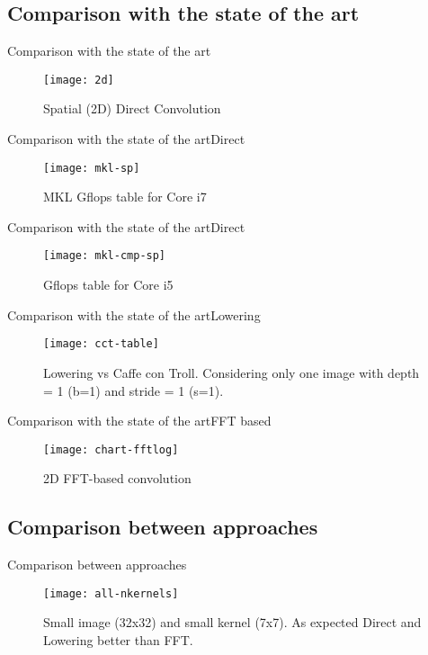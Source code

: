 \subsection{Comparison with the state of the art}
\begin{frame}{Comparison with the state of the art}
\begin{figure}[ht] \label{fig1} 
\texttt{[image: 2d]}
 \caption{Spatial (2D) Direct Convolution} 
\end{figure}

\end{frame}
\begin{frame}{Comparison with the state of the art}{Direct}
\begin{figure}[ht] \label{fig1} 
\texttt{[image: mkl-sp]}
 \caption{MKL Gflops table for Core i7} 
\end{figure}
\end{frame}

\begin{frame}{Comparison with the state of the art}{Direct}
\begin{figure}[ht] \label{fig1} 
\texttt{[image: mkl-cmp-sp]}
 \caption{Gflops table for Core i5} 
\end{figure}
\end{frame}

\begin{frame}{Comparison with the state of the art}{Lowering}
\begin{figure}[ht] \label{fig1} 
\texttt{[image: cct-table]}
 \caption{Lowering vs Caffe con Troll. Considering only one image with depth = 1 (b=1) and stride = 1 (s=1).} 
\end{figure}
\end{frame}

\begin{frame}{Comparison with the state of the art}{FFT based}
\begin{figure}[htc] \label{fig1} 
\texttt{[image: chart-fftlog]}
 \caption{2D FFT-based convolution} 
\end{figure}
\end{frame}

\subsection{Comparison between approaches}

\begin{frame}{Comparison between approaches}
\begin{figure}[ht] \label{fig1} 
\texttt{[image: all-nkernels]}
 \caption{Small image (32x32) and small kernel (7x7). As expected Direct and Lowering better than FFT.} 
\end{figure}
\end{frame}

